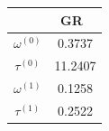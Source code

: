 \documentclass[twocolumn,
               prd,
               aps,
               superscriptaddress,
               tightenlines,
               nofootinbib,
               eqsecnum,
               amsfonts,
               amsmath,
               longbibliography]{revtex4-1}
\begin{document}
\begin{table}[t]
%
\begin{tabular}{c | c }
\hline
\hline
                        & GR~\cite{Maselli:2019mjd} \\
\hline
$\omega^{(0)}$    & 0.3737                    \\
$\tau^{(0)}$      & 11.2407                   \\
$\omega^{(1)}$    & 0.1258                    \\
$\tau^{(1)}$      & 0.2522                    \\
\hline
\hline
\end{tabular}

\end{table}
\end{document}

